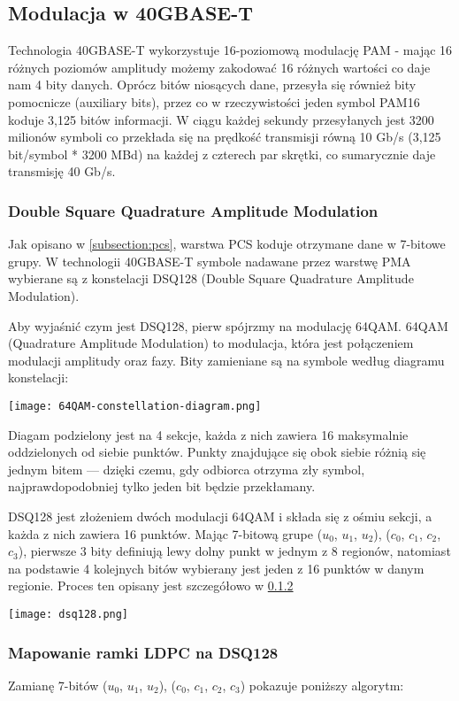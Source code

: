 \subsection{Modulacja w 40GBASE-T}
Technologia 40GBASE-T wykorzystuje 16-poziomową modulację PAM - mając 16 różnych poziomów amplitudy możemy zakodować 16 różnych wartości co daje nam 4 bity danych.
Oprócz bitów niosących dane, przesyła się również bity pomocnicze (auxiliary bits), przez co w rzeczywistości jeden symbol PAM16 koduje 3,125 bitów informacji.
W ciągu każdej sekundy przesyłanych jest 3200 milionów symboli co przekłada się na prędkość transmisji równą 10 Gb/s (3,125 bit/symbol * 3200 MBd) na każdej z czterech par skrętki, co sumarycznie daje transmisję 40 Gb/s.

\subsubsection{Double Square Quadrature Amplitude Modulation}
Jak opisano w \ref{subsection:pcs}, warstwa PCS koduje otrzymane dane w 7-bitowe grupy. W technologii 40GBASE-T symbole nadawane przez warstwę PMA wybierane są z konstelacji DSQ128 (Double Square Quadrature Amplitude Modulation).

Aby wyjaśnić czym jest DSQ128, pierw spójrzmy na modulację 64QAM. 64QAM (Quadrature Amplitude Modulation) to modulacja, która jest połączeniem modulacji amplitudy oraz fazy. Bity zamieniane są na symbole według diagramu konstelacji:

\texttt{[image: 64QAM-constellation-diagram.png]}

Diagam podzielony jest na 4 sekcje, każda z nich zawiera 16 maksymalnie oddzielonych od siebie punktów. Punkty znajdujące się obok siebie różnią się jednym bitem --- dzięki czemu, gdy odbiorca otrzyma zły symbol, najprawdopodobniej tylko jeden bit będzie przekłamany.

DSQ128 jest złożeniem dwóch modulacji 64QAM i składa się z ośmiu sekcji, a każda z nich zawiera 16 punktów. Mając 7-bitową grupe ($u_0$, $u_1$, $u_2$), ($c_0$, $c_1$, $c_2$, $c_3$), pierwsze 3 bity definiują lewy dolny punkt w jednym z 8 regionów, natomiast na podstawie 4 kolejnych bitów wybierany jest jeden z 16 punktów w danym regionie. Proces ten opisany jest szczegółowo w \ref{mapowanie}

\texttt{[image: dsq128.png]}

\subsubsection{Mapowanie ramki LDPC na DSQ128}\label{mapowanie}
Zamianę 7-bitów ($u_0$, $u_1$, $u_2$), ($c_0$, $c_1$, $c_2$, $c_3$) pokazuje poniższy algorytm:

